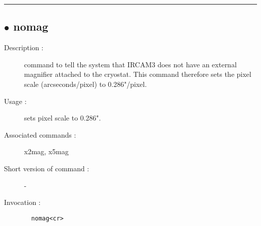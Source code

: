 \hrule \subsection*{$\bullet$ nomag}
\begin{description}
\item[Description :] command to tell the system that {\sc IRCAM3} does not have an external
magnifier attached to the cryostat.  This command therefore sets the
pixel scale (arcseconds/pixel) to 0.286"/pixel.
\item[Usage :] sets pixel scale to 0.286".
\item[Associated commands :] x2mag, x5mag
\item[Short version of command :] -
\item[Invocation :]

\verb+  nomag<cr> +\end{description}

